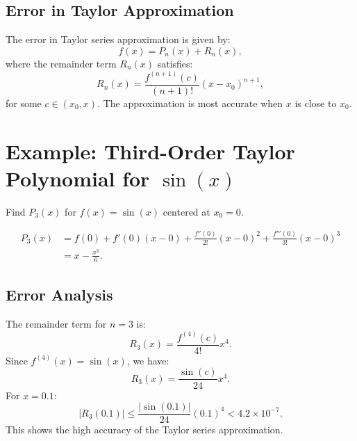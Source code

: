 \documentclass[12pt]{article}
\begin{document}
\subsection{Error in Taylor Approximation}

The error in Taylor series approximation is given by:
\begin{equation*}
    f(x) = P_n(x) + R_n(x),
\end{equation*}
where the remainder term $R_n(x)$ satisfies:
\begin{equation*}
    R_n(x) = \frac{f^{(n+1)}(c)}{(n+1)!} (x - x_0)^{n+1},
\end{equation*}
for some $c \in (x_0, x)$. The approximation is most accurate when $x$ is 
close to $x_0$.

\section{Example: Third-Order Taylor Polynomial for $\sin(x)$}

Find $P_3(x)$ for $f(x) = \sin(x)$ centered at $x_0 = 0$.

\begin{align*}
    P_3(x) &= f(0) + f'(0)(x - 0) + \frac{f''(0)}{2!} (x - 0)^2 + 
             \frac{f'''(0)}{3!} (x - 0)^3 \\
           &= x - \frac{x^3}{6}.
\end{align*}

\subsection{Error Analysis}

The remainder term for $n = 3$ is:
\begin{equation*}
    R_3(x) = \frac{f^{(4)}(c)}{4!} x^4.
\end{equation*}
Since $f^{(4)}(x) = \sin(x)$, we have:
\begin{equation*}
    R_3(x) = \frac{\sin(c)}{24} x^4.
\end{equation*}
For $x = 0.1$:
\begin{equation*}
    |R_3(0.1)| \leq \frac{|\sin(0.1)|}{24} (0.1)^4 < 4.2 \times 10^{-7}.
\end{equation*}
This shows the high accuracy of the Taylor series approximation.
\end{document}
